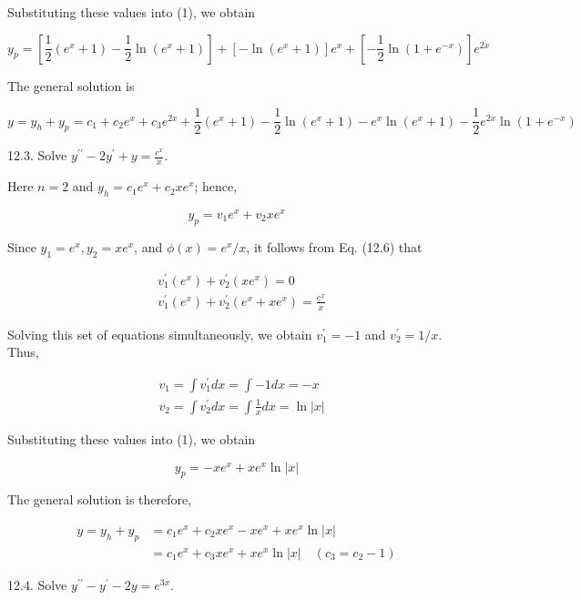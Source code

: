 \documentclass[10pt]{article}
\begin{document}
Substituting these values into (1), we obtain

$$
y_{p}=\left[\frac{1}{2}\left(e^{x}+1\right)-\frac{1}{2} \ln \left(e^{x}+1\right)\right]+\left[-\ln \left(e^{x}+1\right)\right] e^{x}+\left[-\frac{1}{2} \ln \left(1+e^{-x}\right)\right] e^{2 x}
$$

The general solution is

$$
y=y_{h}+y_{p}=c_{1}+c_{2} e^{x}+c_{3} e^{2 x}+\frac{1}{2}\left(e^{x}+1\right)-\frac{1}{2} \ln \left(e^{x}+1\right)-e^{x} \ln \left(e^{x}+1\right)-\frac{1}{2} e^{2 x} \ln \left(1+e^{-x}\right)
$$

12.3. Solve $y^{\prime \prime}-2 y^{\prime}+y=\frac{e^{x}}{x}$.

Here $n=2$ and $y_{h}=c_{1} e^{x}+c_{2} x e^{x}$; hence,


\begin{equation*}
y_{p}=v_{1} e^{x}+v_{2} x e^{x} \tag{1}
\end{equation*}


Since $y_{1}=e^{x}, y_{2}=x e^{x}$, and $\phi(x)=e^{x} / x$, it follows from Eq. (12.6) that

$$
\begin{aligned}
& v_{1}^{\prime}\left(e^{x}\right)+v_{2}^{\prime}\left(x e^{x}\right)=0 \\
& v_{1}^{\prime}\left(e^{x}\right)+v_{2}^{\prime}\left(e^{x}+x e^{x}\right)=\frac{e^{x}}{x}
\end{aligned}
$$

Solving this set of equations simultaneously, we obtain $v_{1}^{\prime}=-1$ and $v_{2}^{\prime}=1 / x$. Thus,

$$
\begin{aligned}
& v_{1}=\int v_{1}^{\prime} d x=\int-1 d x=-x \\
& v_{2}=\int v_{2}^{\prime} d x=\int \frac{1}{x} d x=\ln |x|
\end{aligned}
$$

Substituting these values into (1), we obtain

$$
y_{p}=-x e^{x}+x e^{x} \ln |x|
$$

The general solution is therefore,

$$
\begin{aligned}
y=y_{h}+y_{p} & =c_{1} e^{x}+c_{2} x e^{x}-x e^{x}+x e^{x} \ln |x| \\
& =c_{1} e^{x}+c_{3} x e^{x}+x e^{x} \ln |x| \quad\left(c_{3}=c_{2}-1\right)
\end{aligned}
$$

12.4. Solve $y^{\prime \prime}-y^{\prime}-2 y=e^{3 x}$.
\end{document}
